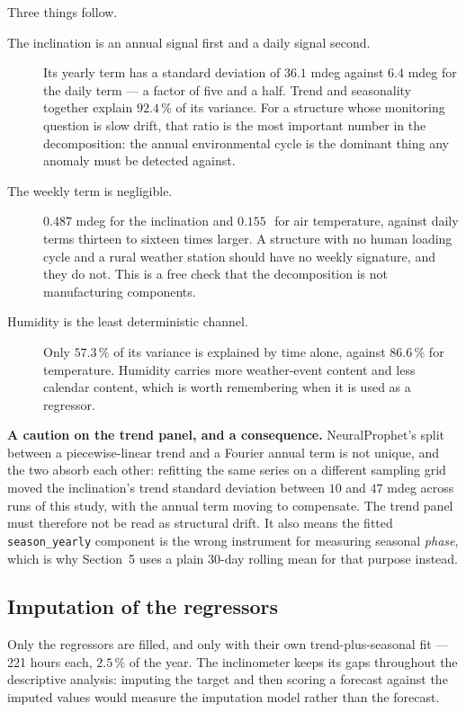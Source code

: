 \documentclass[11pt,a4paper]{article}
\begin{document}
Three things follow.

\begin{description}
\item[The inclination is an annual signal first and a daily signal second.] Its yearly
term has a standard deviation of $36.1$ mdeg against $6.4$ mdeg for the daily term ---
a factor of five and a half. Trend and seasonality together explain $92.4\,\%$ of its
variance. For a structure whose monitoring question is slow drift, that ratio is the
most important number in the decomposition: the annual environmental cycle is the
dominant thing any anomaly must be detected against.
\item[The weekly term is negligible.] $0.487$ mdeg for the inclination and
$0.155$\,\degC\ for air temperature, against daily terms thirteen to sixteen times
larger. A structure with no human loading cycle and a rural weather station should have
no weekly signature, and they do not. This is a free check that the decomposition is
not manufacturing components.
\item[Humidity is the least deterministic channel.] Only $57.3\,\%$ of its variance is
explained by time alone, against $86.6\,\%$ for temperature. Humidity carries more
weather-event content and less calendar content, which is worth remembering when it is
used as a regressor.
\end{description}

\medskip
\noindent\textbf{A caution on the trend panel, and a consequence.} NeuralProphet's
split between a piecewise-linear trend and a Fourier annual term is not unique, and the
two absorb each other: refitting the same series on a different sampling grid moved the
inclination's trend standard deviation between $10$ and $47$ mdeg across runs of this
study, with the annual term moving to compensate. The trend panel must therefore not be
read as structural drift. It also means the fitted \texttt{season\_yearly} component is
the wrong instrument for measuring seasonal \emph{phase}, which is why Section~5 uses a
plain 30-day rolling mean for that purpose instead.

\subsection{Imputation of the regressors}

Only the regressors are filled, and only with their own trend-plus-seasonal fit --- 221
hours each, $2.5\,\%$ of the year. The inclinometer keeps its gaps throughout the
descriptive analysis: imputing the target and then scoring a forecast against the
imputed values would measure the imputation model rather than the forecast.
\end{document}
